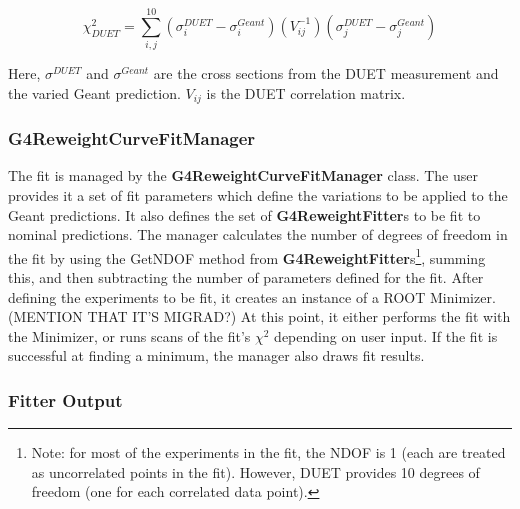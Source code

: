 \documentclass[12pt]{article}
\begin{document}
\begin{equation}
\chi^2_{DUET} = \sum\limits_{i,j}^{10}(\sigma^{DUET}_i - \sigma^{Geant}_i)(V_{ij}^{-1})(\sigma^{DUET}_j - \sigma^{Geant}_j)
\end{equation}

Here, $\sigma^{DUET}$ and $\sigma^{Geant}$ are the cross sections from the DUET measurement and the varied Geant prediction. $V_{ij}$ is the DUET correlation matrix.

\subsubsection{G4ReweightCurveFitManager} 

The fit is managed by the \textbf{G4ReweightCurveFitManager} class. The user provides it a set of fit parameters which define the variations to be applied to the Geant predictions. It also defines the set of \textbf{G4ReweightFitter}s to be fit to nominal predictions. The manager calculates the number of degrees of freedom in the fit by using the GetNDOF method from \textbf{G4ReweightFitter}s\footnote{Note: for most of the experiments in the fit, the NDOF is 1 (each are treated as uncorrelated points in the fit). However, DUET provides 10 degrees of freedom (one for each correlated data point).}, summing this, and then subtracting the number of parameters defined for the fit. After defining the experiments to be fit, it creates an instance of a ROOT Minimizer. (MENTION THAT IT'S MIGRAD?) At this point, it either performs the fit with the Minimizer, or runs scans of the fit's $\chi^2$ depending on user input. If the fit is successful at finding a minimum, the manager also draws fit results. 

\subsubsection{Fitter Output}
\end{document}
